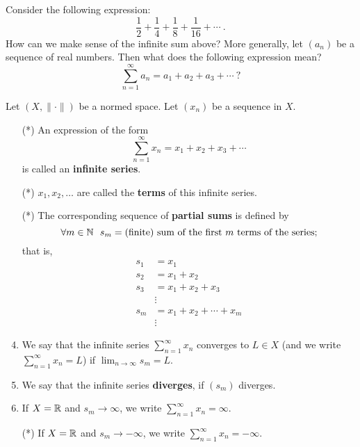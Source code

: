 \documentclass[a4paper]{article}
\begin{document}
Consider the following expression:
\[  \frac{ 1  }{  2  }  + \frac{ 1  }{  4  }  + \frac{ 1  }{  8  }  + \frac{ 1 }{ 16  }  + \cdots \ . \]
How can we make sense of the infinite sum above? More generally, let \( ({a}_{n}) \) be a sequence of real numbers. Then what does the following expression mean?
\[  \sum_{ n=1  }^{ \infty  } {a}_{n} = {a}_{1} + {a}_{2} + {a}_{3} + \cdots \ ? \]
\begin{definition}
    Let \( (X, \|\cdot\|) \) be a normed space. Let \( ({x}_{n}) \) be a sequence in \( X  \). 
    \begin{enumerate}
        \item[(*)] An expression of the form 
            \[  \sum_{ n=1  }^{ \infty  } {x}_{n} = {x}_{1} + {x}_{2} + {x}_{3} + \cdots  \]
            is called an \textbf{infinite series}.
        \item[(*)] \( {x}_{1}, {x}_{2}, \dots  \) are called the \textbf{terms} of this infinite series.
        \item[(*)] The corresponding sequence of \textbf{partial sums} is defined by
            \[  \forall m \in \mathbb{N}  \ \ {s}_{m} = \text{(finite) sum of the first \(  m  \) terms of the series}; \]
            that is,
            \begin{align*}
                {s}_{1} &= {x}_{1} \\
                {s}_{2} &= {x}_{1} + {x}_{2} \\
                {s}_{3} &= {x}_{1} + {x}_{2} + {x}_{3} \\
                        &\vdots \\
                {s}_{m} &= {x}_{1} + {x}_{2} + \cdots + {x}_{m} \\
                        &\vdots
            \end{align*}
        \item We say that the infinite series \( \sum_{ n=1  }^{ \infty  } {x}_{n}  \) converges to \( L \in X  \) (and we write \( \sum_{ n=1  }^{ \infty  } {x}_{n} = L  \)) if \( \lim_{ n \to \infty  }  {s}_{m} =  L  \).
        \item We say that the infinite series \textbf{diverges}, if \( ({s}_{m}) \) diverges.
        \item If \( X = \mathbb{R}  \) and \( {s}_{m} \to \infty   \), we write \( \sum_{ n=1  }^{ \infty  } {x}_{n} = \infty  \).
        \item[(*)] If \( X = \mathbb{R}  \) and \( {s}_{m} \to - \infty   \), we write \( \sum_{ n=1  }^{ \infty  } {x}_{n} = - \infty  \).
    \end{enumerate}
\end{definition}
\end{document}
